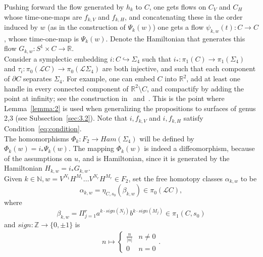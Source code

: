 \documentclass[11pt]{article}
\newenvironment{myequation}
    {
        \begin{equation*}
        \begin{gathered}
    }
    { 
        \end{gathered} 
        \end{equation*}
    }
\newcommand{\R}{\mathbb{R}}
\newcommand{\N}{\mathbb{N}}
\newcommand{\Z}{\mathbb{Z}}
\begin{document}
            Pushing forward the flow generated by $h_k$ to $C$, one gets flows on $C_V$ and $C_H$ whose time-one-maps are $f_{k,V}$ and $f_{k,H}$, and concatenating these in the order induced by $w$ (as in the construction of $\Psi_k(w)$) one gets a flow $\psi_{k,w}(t): C \to C$, whose time-one-map is $\Psi_k(w)$. Denote the Hamiltonian that generates this flow $G_{k,w}: S^1 \times C \to \R$. \\
            
            Consider a symplectic embedding $i: C \hookrightarrow \Sigma_4$ such that $i_*: \pi_1(C) \to \pi_1(\Sigma_4)$ and $\tau_i: \pi_0(\mathscr{L}C) \to \pi_0(\mathscr{L}\Sigma_4)$ are both injective, and such that each component of $\partial C$ separates $\Sigma_4$. For example, one can embed $C$ into $\R^2$, add at least one handle in every connected component of $\R^2 \setminus C$, and compactify by adding the point at infinity; see the construction in~\cite{PS14} and~\cite{10}. This is the point where Lemma~\ref{lemma:2} is used when generalizing the propositions to surfaces of genus 2,3 (see Subsection~\ref{sec:3.2}). Note that $i, f_{k,V}$ and $i, f_{k,H}$ satisfy Condition~\ref{eq:condition}. \\
            
            The homomorphisms $\Phi_k: F_2 \to Ham(\Sigma_4)$ will be defined by $\Phi_k(w) = i_* \Psi_k(w)$. The mapping $\Phi_k(w)$ is indeed a diffeomorphism, because of the assumptions on $u$, and is Hamiltonian, since it is generated by the Hamiltonian $H_{k,w} = i_* G_{k,w}$. \\
            
            Given $k \in \N, w = V^{N_1} H^{M_1} ... V^{N_r} H^{M_r} \in F_2$, set the free homotopy classes $\alpha_{k,w}$ to be
            \[
                \alpha_{k,w} = \eta_{C,s_0}(\beta_{k,w}) \in \pi_0(\mathscr{L}C) ,
            \]
            where
            \[
                \beta_{k,w} = \Pi_{j=1}^r a^{k \cdot sign(N_j)} b^{k \cdot sign(M_j)} \in \pi_1(C,s_0)
            \]
            and $sign: \Z \to \{0, \pm1\}$ is
            \begin{myequation}
                n \mapsto
                \left\{\begin{array}{ll}
                    \frac{n}{|n|}  & n \neq 0 \\
                    0              & n = 0
                \end{array}\right. .
            \end{myequation}
            
\end{document}
